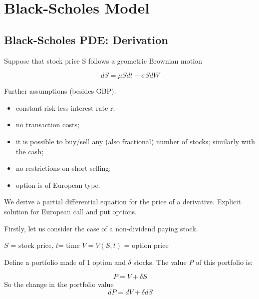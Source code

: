 \chapter{Black-Scholes Model}
\label{ch:BS}

\section{Black-Scholes PDE: Derivation}
Suppose that stock price S follows a geometric Brownian motion

\begin{equation}
dS = \mu Sdt + \sigma SdW
\end{equation}

Further assumptions (besides GBP):
\begin{itemize}
\tightlist 
\item constant risk-less interest rate r;
\item no transaction costs;
\item it is possible to buy/sell any (also fractional) number of stocks; similarly with the cash;
\item no restrictions on short selling;
\item option is of European type.
\end{itemize}

We derive a partial differential equation for the price of a derivative.
Explicit solution for European call and put options.

Firstly, let us consider the case of a non-dividend paying stock.

$S$ = stock price,
$t$= time
$V=V(S, t)$ = option price

Define a portfolio made of 1 option and $\delta$ stocks. The value $P$ of this portfolio is:

\begin{equation}
P = V + \delta S
\end{equation}
So the change in the portfolio value
\begin{equation}
 dP = dV + \delta dS
\end{equation}

